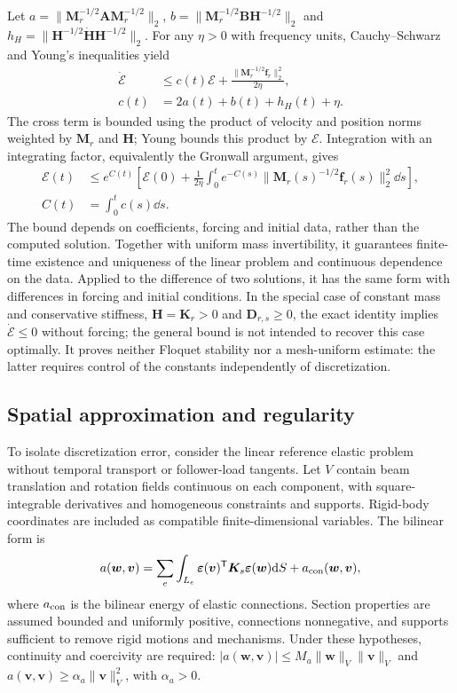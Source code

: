 Let $a=\|\bm M_r^{-1/2}\bm A\bm M_r^{-1/2}\|_2$, $b=\|\bm M_r^{-1/2}\bm B\bm H^{-1/2}\|_2$ and $h_H=\|\bm H^{-1/2}\dot{\bm H}\bm H^{-1/2}\|_2$. For any $\eta>0$ with frequency units, Cauchy--Schwarz and Young's inequalities yield
\begin{align}
\dot{\mathcal E}&\le c(t)\mathcal E+
\frac{\|\bm M_r^{-1/2}\bm f_r\|_2^2}{2\eta},\nonumber\\
c(t)&=2a(t)+b(t)+h_H(t)+\eta.
\label{eq:ap-differential}
\end{align}
The cross term is bounded using the product of velocity and position norms weighted by $\bm M_r$ and $\bm H$; Young bounds this product by $\mathcal E$. Integration with an integrating factor, equivalently the Gronwall argument, gives
\begin{align}
\mathcal E(t)&\le e^{C(t)}\left[\mathcal E(0)+\frac1{2\eta}
\int_0^t e^{-C(s)}\|\bm M_r(s)^{-1/2}\bm f_r(s)\|_2^2\dd s\right],\nonumber\\
C(t)&=\int_0^t c(s)\dd s.
\label{eq:ap-bound}
\end{align}
The bound depends on coefficients, forcing and initial data, rather than the computed solution. Together with uniform mass invertibility, it guarantees finite-time existence and uniqueness of the linear problem and continuous dependence on the data. Applied to the difference of two solutions, it has the same form with differences in forcing and initial conditions. In the special case of constant mass and conservative stiffness, $\bm H=\bm K_r>0$ and $\bm D_{r,s}\ge0$, the exact identity implies $\dot{\mathcal E}\le0$ without forcing; the general bound is not intended to recover this case optimally. It proves neither Floquet stability nor a mesh-uniform estimate: the latter requires control of the constants independently of discretization.

\subsection{Spatial approximation and regularity}
To isolate discretization error, consider the linear reference elastic problem without temporal transport or follower-load tangents. Let $V$ contain beam translation and rotation fields continuous on each component, with square-integrable derivatives and homogeneous constraints and supports. Rigid-body coordinates are included as compatible finite-dimensional variables. The bilinear form is
\begin{equation}
a(\bm w,\bm v)=\sum_e\int_{L_e}
\bm\varepsilon(\bm v)^\mathsf T\bm K_s\bm\varepsilon(\bm w)\mathrm d S
+a_{\rm con}(\bm w,\bm v),
\label{eq:ap-bilinear}
\end{equation}
where $a_{\rm con}$ is the bilinear energy of elastic connections. Section properties are assumed bounded and uniformly positive, connections nonnegative, and supports sufficient to remove rigid motions and mechanisms. Under these hypotheses, continuity and coercivity are required: $|a(\bm w,\bm v)|\le M_a\|\bm w\|_V\|\bm v\|_V$ and $a(\bm v,\bm v)\ge\alpha_a\|\bm v\|_V^2$, with $\alpha_a>0$.

